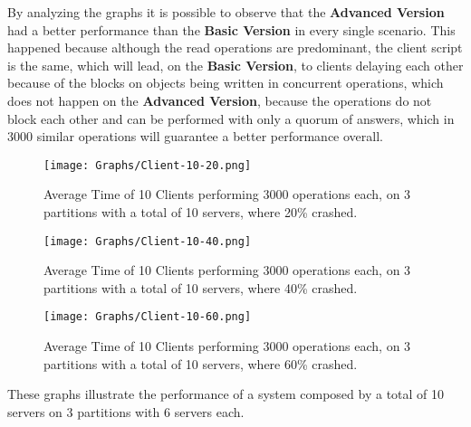 \documentclass[times, 10pt,twocolumn]{article}
\begin{document}
By analyzing the graphs it is possible to observe that the \textbf{Advanced Version} had a better performance than the \textbf{Basic Version} in every single scenario. This happened because although the read operations are predominant, the client script is the same, which will lead, on the \textbf{Basic Version},  to clients delaying each other because of the blocks on objects being written in concurrent operations, which does not happen on the \textbf{Advanced Version}, because the operations do not block each other and can be performed with only a quorum of answers, which in 3000 similar operations will guarantee a better performance overall.
\newpage
\begin{figure}[h!]
	\centering
	\texttt{[image: Graphs/Client-10-20.png]}
	\caption{Average Time of 10 Clients performing 3000 operations each, on 3 partitions with a total of 10 servers, where 20\% crashed.}
	\vspace{0.15in}
	\centering
	\texttt{[image: Graphs/Client-10-40.png]}
	\caption{Average Time of 10 Clients performing 3000 operations each, on 3 partitions with a total of 10 servers, where 40\% crashed.}
	\vspace{0.15in}
	\centering
	\texttt{[image: Graphs/Client-10-60.png]}
	\caption{Average Time of 10 Clients performing 3000 operations each, on 3 partitions with a total of 10 servers, where 60\% crashed.}
\end{figure}
These graphs illustrate the performance of a system composed by a total of 10 servers on 3 partitions with 6 servers each.
\end{document}
